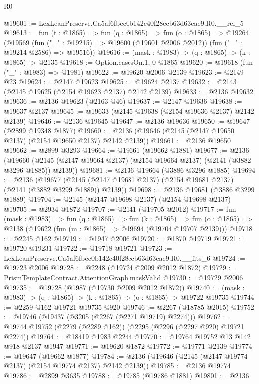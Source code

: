 \begin{lexlean}{R0}
\begin{coremodule}
@19601 := LexLeanPreserve.Ca5af6fbec0b142c40f28ecb63d63cae9.R0.__rel_5
@19613 := fun (t : @1865) =>
  fun (q : @1865) =>
  fun (o : @1865) =>
  @19264
    (@19569
      (fun ("_" : @19215) => @19600 (@19601 @2006 @2012))
      (fun ("_" : @19214 @2586) => @19516))
@19616 := (mask : @1983) -> (q : @1865) -> (k : @1865) -> @2135
@19618 := Option.casesOn.{1, 0} @1865
@19620 := @19618 (fun ("_" : @1983) => @1981)
@19622 := @19620 @2006 @2139
@19623 := @2149 @23
@19624 := @2147 @19623
@19625 := @19624 @2137
@19632 := @2143 (@2145 @19625 (@2154 @19623 @2137) @2142 @2139)
@19633 := @2136 @19632
@19636 := @2136 @19623 (@2163 @46)
@19637 := @2147 @19636
@19638 := @19637 @2137
@19645 := @19633 (@2145 @19638 (@2154 @19636 @2137) @2142 @2139)
@19646 := @2136 @19645
@19647 := @2136 @19636
@19650 := @19647 (@2899 @19348 @1877)
@19660 := @2136 (@19646 (@2145 (@2147 @19650 @2137) (@2154 @19650 @2137) @2142 @2139))
@19661 := @2136 @19650
@19662 := @2899 @3293
@19664 := @19661 (@19662 @1881)
@19677 := @2136
    (@19660 (@2145 (@2147 @19664 @2137) (@2154 @19664 @2137) (@2141 (@3882 @3296 @1885)) @2139))
@19681 := @2136 @19664 (@3886 @3296 @1885)
@19694 := @2136
    (@19677 (@2145 (@2147 @19681 @2137) (@2154 @19681 @2137) (@2141 (@3882 @3299 @1889)) @2139))
@19698 := @2136 @19681 (@3886 @3299 @1889)
@19704 := @2145 (@2147 @19698 @2137) (@2154 @19698 @2137)
@19705 := @2934 @1872
@19707 := @2141 (@19705 @2012)
@19717 := fun (mask : @1983) =>
  fun (q : @1865) =>
  fun (k : @1865) =>
  fun (o : @1865) => @2138 (@19622 (fun (m : @1865) => @19694 (@19704 @19707 @2139)))
@19718 := @2245 @162
@19719 := @1947 @2006
@19720 := @1870 @19719
@19721 := @19720 @19231
@19722 := @19718 @19721
@19723 := LexLeanPreserve.Ca5af6fbec0b142c40f28ecb63d63cae9.R0.__fits_6
@19724 := @19723 @2006
@19728 := @2248 (@19724 @2009 @2012 @1872)
@19729 := PrismTemplateContract.AttentionGraph.maskValid
@19730 := @19729 @2006
@19735 := @19728 (@1987 (@19730 @2009 @2012 @1872))
@19740 := (mask : @1983) -> (q : @1865) -> (k : @1865) -> (o : @1865) -> @19722 @19735
@19744 := @2259 @162 @19721 @19735 @920
@19746 := @2267 (@18785 @2015)
@19752 := @19746 (@19437 (@3205 (@2267 (@2271 @19719) @2274)))
@19762 := @19744 @19752 (@2279 (@2289 @162)) (@2295 (@2296 (@2297 @920) @19721 @2274))
@19764 := @18419 @1983 @2244
@19770 := @19764 @19752 @13 @142 @918 @2137 @1947
@19771 := @19620 @1872
@19772 := @19771 @2139
@19774 := @19647 (@19662 @1877)
@19784 := @2136 (@19646 (@2145 (@2147 @19774 @2137) (@2154 @19774 @2137) @2142 @2139))
@19785 := @2136 @19774
@19786 := @2899 @3635
@19788 := @19785 (@19786 @1881)
@19801 := @2136

\end{coremodule}
\end{lexlean}
